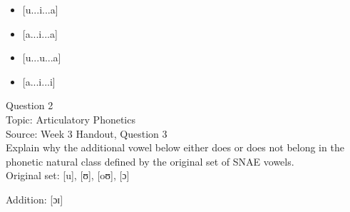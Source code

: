 \documentclass[12pt]{article}
\begin{document}
\begin{itemize} \item {[u...i...a]} \item {[a...i...a]} \item {[u...u...a]} \item {[a...i...i]} \end{itemize}


\newpage

{\large Question 2}\\

Topic: Articulatory Phonetics\\
Source: Week 3 Handout, Question 3\\

Explain why the additional vowel below either does or does not belong in the phonetic natural class defined by the original set of SNAE vowels.\\

Original set: {[u]}, {[ʊ]}, {[oʊ]}, {[ɔ]}

Addition: {[ɔɪ]}


\newpage

\begin{center}
\textbf{{\color{red}{\HUGE END OF EXAM}}}\\

\end{center}
\newpage
\end{document}
